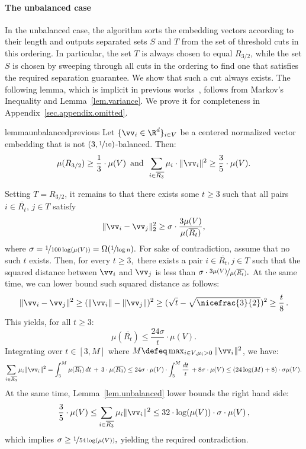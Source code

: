 \documentclass[letterpaper]{article}
\begin{document}
\paragraph{The unbalanced case}
In the unbalanced case, the \roundcut algorithm sorts the embedding vectors according to their length and outputs separated sets $S$ and $T$
from the set of threshold cuts in this ordering. In particular, the set $T$ is always chosen to equal $R_{3/2}$, while the set $S$ is chosen by sweeping through all cuts in the ordering to find one that satisfies the required separation guarantee. We show that such a cut always exists.
The following lemma, which is implicit in previous works~\cite{ARV2009, agarwal2005log}, follows from Markov's Inequality and Lemma~\ref{lem.variance}. We prove it for completeness in Appendix~\ref{sec.appendix.omitted}.
\begin{restatable}{lemma}{unbalancedprevious}
\label{lem.unbalanced}
Let $\{ \vv_i \in \R^d \}_{i \in V}$ be a centered normalized vector embedding that is not $(3,\nicefrac{1}{10})$-balanced. Then:
$$
\mu(R_{3/2}) \geq \frac{1}{3} \cdot \mu(V) \, \textrm{ and } \, \sum_{i \in \overline{R_3}} \mu_i \cdot \|\vv_i\|^2 \geq \frac{3}{5} \cdot \mu(V).
$$
\end{restatable}
\noindent
Setting $T = R_{3/2}$, it remains to that there exists some $t \geq 3$ such that all pairs $i \in \overline{R_t}$, $j \in T$ satisfy
\begin{equation}
\label{eq.condition}
\lVert \vv_i - \vv_j \rVert_2^2 \geq \sigma \cdot \frac{3\mu(V)}{\mu(\overline{R_t})},
\end{equation}
where $\sigma = \nicefrac{1}{100 \log(\mu(V))} = \Omega(\nicefrac{1}{\log n}).$
For sake of contradiction, assume that no such $t$ exists. Then, for every $t \geq 3,$ there exists a pair $i \in \overline{R_t}, j \in T$ such that the squared distance between $\vv_i$ and $\vv_j$ is less than $\sigma \cdot \nicefrac{3\mu(V)}{\mu(\overline{R_t})}.$
At the same time, we  can lower bound such squared distance as follows:
\begin{equation}
\label{eq.dist-lower}
\|\vv_i - \vv_j\|^2 \geq (\|\vv_i\| - \|\vv_j\|)^2 \geq (\sqrt{t} - \sqrt{\nicefrac{3}{2}})^2 \geq \frac{t}{8}\,.
\end{equation}
This yields, for all $t \geq 3$:
$$
\mu(\overline{R_t}) \leq \frac{24\sigma}{t} \cdot \mu(V).
$$
Integrating over $t \in [3,M]$ where $M \defeq \max_{i \in V, \mu_i > 0} \|\vv_i\|^2$, we have:
$$
\sum_{i \in \overline{R_3} }\mu_i \|\vv_i\|^2 = \int_3^M \mu(\overline{R_t}) \, dt\, +\, 3 \cdot \mu(\overline{R_3}) \leq 24\sigma \cdot \mu(V) \cdot \int_3^M \frac{dt}{t} \, + 8 \sigma \cdot \mu(V) \leq (24 \log(M) + 8) \cdot \sigma \mu(V).
$$
At the same time, Lemma~\ref{lem.unbalanced} lower bounds the right hand side:
$$
\frac{3}{5} \cdot \mu(V) \leq \sum_{i \in \overline{R_3} }\mu_i \|\vv_i\|^2 \leq 32 \cdot \log(\mu(V)) \cdot \sigma\cdot \mu(V)\,,
$$
which implies
$
\sigma \geq \nicefrac{1}{54 \log(\mu(V))},
$
yielding the required contradiction.
\end{document}
